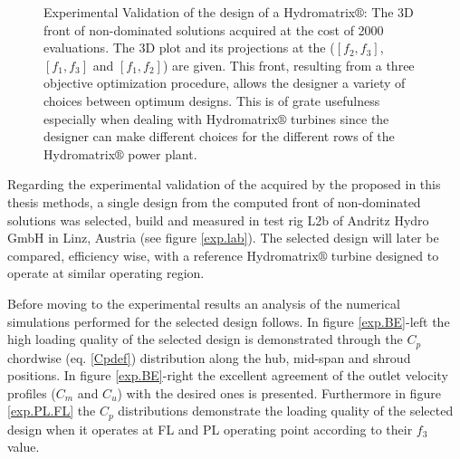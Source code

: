 \begin{figure}[h!]
\begin{minipage}[b]{0.5\linewidth}
\end{minipage}
\begin{minipage}[b]{0.5\linewidth}
 \centering
\end{minipage}
\caption{Experimental Validation of the design of a Hydromatrix$\circledR$: The 3D front of non-dominated solutions acquired at the cost of 2000 evaluations. The 3D plot and its projections at the ($[f_2,f_3]$, $[f_1,f_3]$ and $[f_1,f_2]$) are given. This front, resulting from a three objective optimization procedure, allows the designer a variety of choices between optimum designs. This is of grate usefulness especially when dealing with Hydromatrix$\circledR$ turbines since the designer can make different choices for the different rows of the  Hydromatrix$\circledR$ power plant. }
\label{exp.pareto}
\end{figure}

Regarding the experimental validation of the acquired by the proposed in this thesis methods, a single design from the computed front of non-dominated solutions was selected, build and measured           in test rig L2b of Andritz Hydro GmbH in Linz, Austria (see figure \ref{exp.lab}). The selected design will later be compared, efficiency wise, with a reference Hydromatrix$\circledR$ turbine designed to operate at similar operating region.    

Before moving to the experimental results an analysis of the numerical simulations performed for the selected design follows. In figure \ref{exp.BE}-left the high loading quality of the selected design is demonstrated through the $C_p$ chordwise (eq. \ref{Cpdef}) distribution along the hub, mid-span and shroud positions. In figure \ref{exp.BE}-right the excellent agreement of the outlet velocity profiles ($C_m$ and $C_u$) with the desired ones is presented. Furthermore in figure \ref{exp.PL.FL} the $C_p$ distributions demonstrate the loading quality of the selected design when it operates at FL and PL operating point according to their $f_3$ value.    

